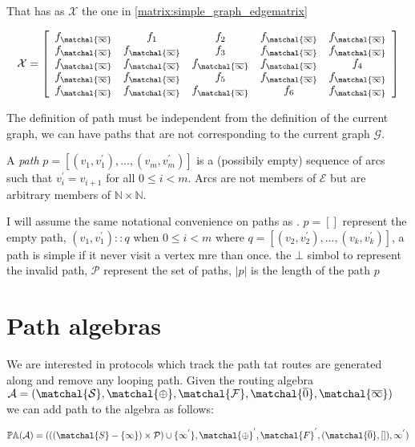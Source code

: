 \documentclass[10pt,conference,letterpaper]{IEEEtran}
\theoremstyle{definition}
\theoremstyle{remark}
\newcommand{\edgeset}{\ensuremath{\mathcal{E}}\xspace}
\newcommand{\graphg}{\ensuremath{\mathcal{G}}\xspace}
\newcommand{\natpernat}{\ensuremath{\mathcal{\mathbb{N} \times \mathbb{N}}}\xspace}
\newcommand{\semiringset}{\ensuremath{\matchal{S}}\xspace}
\newcommand{\semiringchoice}{\ensuremath{\matchal{\oplus}}\xspace}
\newcommand{\semiringfunctions}{\ensuremath{\matchal{F}}\xspace}
\newcommand{\semiringempty}{\ensuremath{\matchal{\overline{\rm 0}}}\xspace}
\newcommand{\semiringinvalid}{\ensuremath{\matchal{\overline{\rm \infty}}}\xspace}
\newcommand{\semiring}{\ensuremath{\mathcal{(\semiringset, \semiringchoice, \semiringfunctions, \semiringempty, \semiringinvalid)}}\xspace}
\newcommand{\invalidfunction}{\ensuremath{f_\semiringinvalid}\xspace}
\newcommand{\Amatrix}{\ensuremath{\mathcal{X}}\xspace}
\newcommand{\invalidpath}{\ensuremath{\mathcal{\bot}}\xspace}
\newcommand{\pathset}{\ensuremath{\mathcal{P}}\xspace}
\newcommand{\pathalgebra}[1]{\ensuremath{\mathcal{\mathbb{P}\mathbb{A}(#1)} = (((\semiringset - \{\infty\})
	\times \pathset) \cup \{\infty^{'}\}, \semiringchoice^{'}, \semiringfunctions^{'}, 
	(\semiringempty, []), \infty^{'})}\xspace}
\begin{document}
That has as \Amatrix the one in \cref{matrix:simple_graph_edgematrix}

\begin{equation}
	  \Amatrix=
	  \left[ {\begin{array}{ccccc}
		   \invalidfunction & f_{1} & f_{2} & \invalidfunction & \invalidfunction\\
		   \invalidfunction & \invalidfunction & f_{3} & \invalidfunction & \invalidfunction\\
		   \invalidfunction & \invalidfunction & \invalidfunction & \invalidfunction & f_{4}\\
		   \invalidfunction & \invalidfunction & f_{5} & \invalidfunction & \invalidfunction\\
		   \invalidfunction & \invalidfunction & \invalidfunction & f_{6} & \invalidfunction\\
	  \end{array} } \right]
	  \label{matrix:simple_graph_edgematrix}
\end{equation}

The definition of path must be independent from the definition of the current
graph, we can have paths that are not corresponding to the current graph \graphg.

A \textit{path} $p = [(v_{1}, v^{'}_{1}), \xspace ... \xspace , (v_{m}, v^{'}_{m})]$
is a (possibily empty) sequence of arcs such that $v^{'}_{i} = v_{i+1}$ for all 
$0 \leq i < m$. Arcs are not members of \edgeset but are arbitrary members of
\natpernat.

I will assume the same notational convenience on paths as \cite{daggitt2018rate}.
$p = []$ represent the empty path, $(v_1, v^{'}_1) :: q$ when $0 \leq i < m$
where $q = [(v_{2}, v^{'}_{2}), \xspace ... \xspace , (v_{k}, v^{'}_{k})]$,
a path is simple if it never visit a vertex mre than once. the \invalidpath simbol
to represent the invalid path, \pathset represent the set of paths, $|p|$ is the
length of the path $p$

\section{Path algebras}
\label{sec:pathalgebra}

We are interested in protocols which track the path tat routes are generated along and
remove any looping path. Given the routing algebra $\mathcal{A} = \semiring$ we can
add path to the algebra as follows:

\pathalgebra{A}
\end{document}
